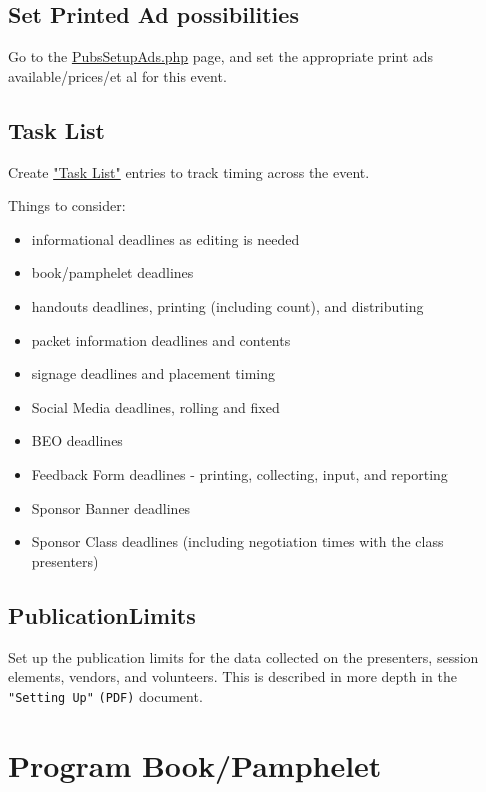 \documentclass[captions=tablesignature]{scrartcl}
\begin{document}
\subsection{Set Printed Ad possibilities}
\label{sec-2-3}
Go to the \href{../webpages/PubsSetupAds.php}{PubsSetupAds.php} page, and set the
appropriate print ads available/prices/et al for this event.
\subsection{Task List}
\label{sec-2-4}

Create \href{../webpages/TaskListUpdate.php?activityid=-1}{"Task List"} entries to track timing across the event.

Things to consider: 
\begin{itemize}
\item informational deadlines as editing is needed
\item book/pamphelet deadlines
\item handouts deadlines, printing (including count), and distributing
\item packet information deadlines and contents
\item signage deadlines and placement timing
\item Social Media deadlines, rolling and fixed
\item BEO deadlines
\item Feedback Form deadlines - printing, collecting, input, and
reporting
\item Sponsor Banner deadlines
\item Sponsor Class deadlines (including negotiation times with the
class presenters)
\end{itemize}

\subsection{PublicationLimits}
\label{sec-2-5}

Set up the publication limits for the data collected on the
presenters, session elements, vendors, and volunteers.  This is
described in more depth in the \texttt{"Setting Up"} \texttt{(PDF)} document.

\section{Program Book/Pamphelet}
\label{sec-3}
\end{document}
